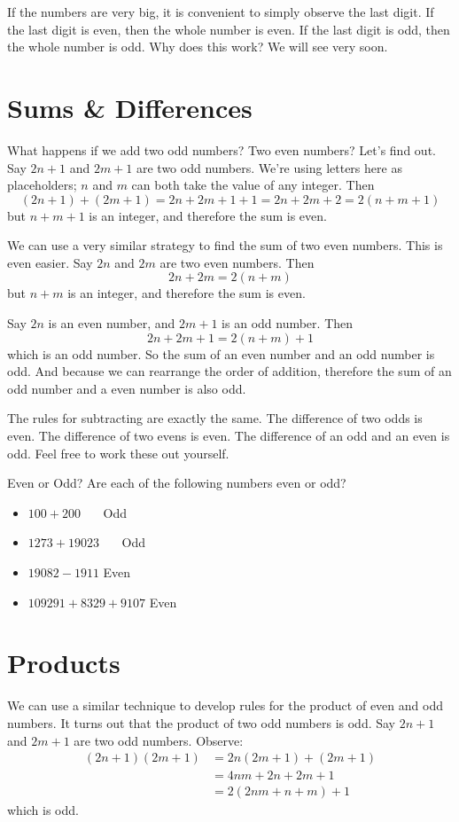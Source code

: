\documentclass[a4paper,10pt]{report}
\begin{document}
If the numbers are very big, it is convenient to simply observe the last digit.
If the last digit is even, then the whole number is even. If the last digit is
odd, then the whole number is odd. Why does this work? We will see very soon.

\section{Sums \& Differences}
What happens if we add two odd numbers? Two even numbers? Let's find out. Say
$2n+1$ and $2m+1$ are two odd numbers. We're using letters here as placeholders;
$n$ and $m$ can both take the value of any integer. Then \[
 (2n+1) + (2m+1) = 2n + 2m + 1 + 1 = 2n + 2m + 2 = 2(n+m+1)
\] but $n+m+1$ is an integer, and therefore the sum is even.

We can use a very similar strategy to find the sum of two even numbers. This is
even easier. Say $2n$ and $2m$ are two even numbers. Then \[
 2n + 2m = 2(n+m)
\] but $n+m$ is an integer, and therefore the sum is even.

Say $2n$ is an even number, and $2m+1$ is an odd number. Then \[
 2n + 2m + 1 = 2(n+m) + 1
\] which is an odd number. So the sum of an even number and an odd number is
odd. And because we can rearrange the order of addition, therefore the sum of an
odd number and a even number is also odd.

The rules for subtracting are exactly the same. The difference of two odds is
even. The difference of two evens is even. The difference of an odd and an even
is odd. Feel free to work these out yourself.

\begin{problem}{Even or Odd?}
 Are each of the following numbers even or odd?

 \begin{itemize}
  \item $100 + 200$ \hfill {}~~~Odd
  \item $1273 + 19023$ \hfill {}~~~Odd
  \item $19082 - 1911$ \hfill Even~~~
  \item $109291 + 8329 + 9107$ \hfill Even~~~
 \end{itemize}
\end{problem}

\section{Products}
We can use a similar technique to develop rules for the product of even and odd
numbers. It turns out that the product of two odd numbers is odd. Say $2n+1$
and $2m+1$ are two odd numbers. Observe: \begin{align*}
 (2n+1)(2m+1)
 &= 2n(2m+1) + (2m+1) \\
 &= 4nm+2n+2m+1 \\
 &= 2(2nm+n+m) + 1
\end{align*} which is odd.
\end{document}
